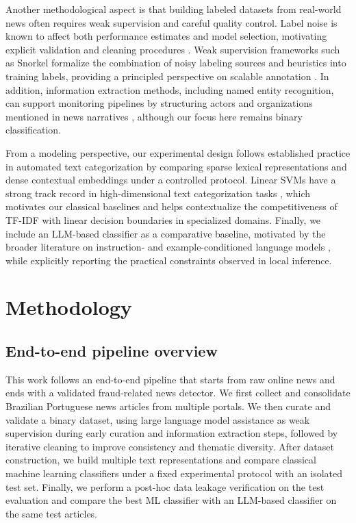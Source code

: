 \documentclass[conference]{IEEEtran}
\begin{document}
Another methodological aspect is that building labeled datasets from real-world news often requires weak supervision and careful quality control. Label noise is known to affect both performance estimates and model selection, motivating explicit validation and cleaning procedures \cite{frenay2014labelnoise}. Weak supervision frameworks such as Snorkel formalize the combination of noisy labeling sources and heuristics into training labels, providing a principled perspective on scalable annotation \cite{ratner2017snorkel}. In addition, information extraction methods, including named entity recognition, can support monitoring pipelines by structuring actors and organizations mentioned in news narratives \cite{fang2025chineseNER}, although our focus here remains binary classification.

From a modeling perspective, our experimental design follows established practice in automated text categorization \cite{sebastiani2002textcategorization} by comparing sparse lexical representations and dense contextual embeddings under a controlled protocol. Linear SVMs have a strong track record in high-dimensional text categorization tasks \cite{joachims1998textcategorization}, which motivates our classical baselines and helps contextualize the competitiveness of TF-IDF with linear decision boundaries in specialized domains. Finally, we include an LLM-based classifier as a comparative baseline, motivated by the broader literature on instruction- and example-conditioned language models \cite{brown2020fewshot}, while explicitly reporting the practical constraints observed in local inference.

\section{Methodology}

\subsection{End-to-end pipeline overview}

This work follows an end-to-end pipeline that starts from raw online news and ends with a validated fraud-related news detector. We first collect and consolidate Brazilian Portuguese news articles from multiple portals. We then curate and validate a binary dataset, using large language model assistance as weak supervision during early curation and information extraction steps, followed by iterative cleaning to improve consistency and thematic diversity. After dataset construction, we build multiple text representations and compare classical machine learning classifiers under a fixed experimental protocol with an isolated test set. Finally, we perform a post-hoc data leakage verification on the test evaluation and compare the best ML classifier with an LLM-based classifier on the same test articles.
\end{document}
